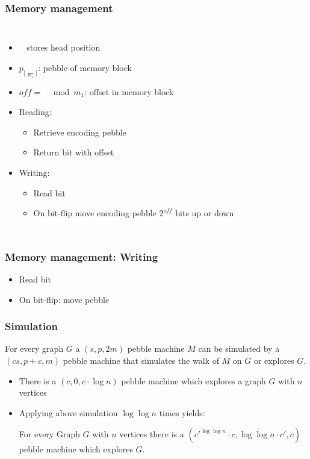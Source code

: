 \documentclass{beamer}
\DeclareMathOperator{\Thead}{T_{\text{head}}}
\begin{document}
\begin{frame}
  \frametitle{Memory management}
  \begin{columns}
    \begin{itemize}
      \item $\Thead$ stores head position
      \item $p_{\lfloor\frac{\Thead}{m_{1}}\rfloor}$: pebble of memory block
      \item $\mathit{off} = \Thead\mod m_{1}$: offset in memory block
      \item Reading:
        \begin{itemize}
          \item Retrieve encoding pebble
          \item Return bit with offset
        \end{itemize}
      \item Writing:
        \begin{itemize}
          \item Read bit
          \item On bit-flip move encoding pebble $2^{\mathit{off}}$ bits up or down
        \end{itemize}
    \end{itemize}
    \resizebox{\textwidth}{!}{}
    \resizebox{\textwidth}{!}{}
  \end{columns}
\end{frame}

\begin{frame}
  \frametitle{Memory management: Writing}
  \begin{itemize}
    \item Read bit
    \item On bit-flip: move pebble
  \end{itemize}
  \resizebox{\textwidth}{!}{}
\end{frame}

\begin{frame}
  \frametitle{Simulation}
  \begin{theorem}
    For every graph $G$ a $(s,p,2m)$ pebble machine $M$ can be simulated by a
    $(cs,p+c,m)$ pebble machine that simulates the walk of $M$ on $G$ or
    explores $G$.
  \end{theorem}
  \begin{itemize}
    \item There is a $(c,0,c\cdot\log n)$ pebble machine which explores
      a graph $G$ with $n$ vertices
    \item Applying above simulation $\log \log n$ times yields:
      \begin{theorem}
        For every Graph $G$ with $n$ vertices there is a
        $(c'^{\log\log n}\cdot c, \log\log n\cdot c', c)$ pebble machine
        which explores $G$.
      \end{theorem}
  \end{itemize}
\end{frame}
\end{document}
